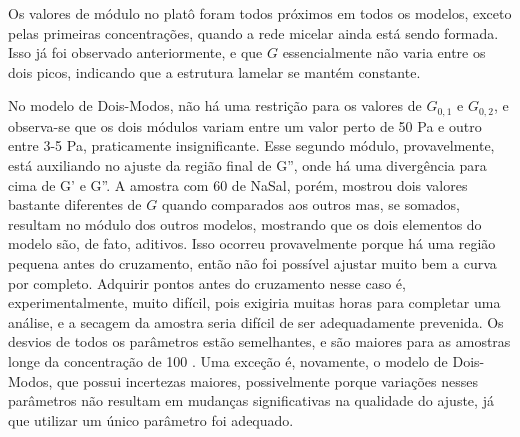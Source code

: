 	Os valores de módulo no platô foram todos próximos em todos os modelos, exceto pelas primeiras concentrações, quando a rede micelar ainda está sendo formada. Isso já foi observado anteriormente\cite{Rehage1991}, e que \(G\) essencialmente não varia entre os dois picos, indicando que a estrutura lamelar se mantém constante.
	
	No modelo de Dois-Modos, não há uma restrição para os valores de \(G_{0,1}\) e \(G_{0,2}\), e observa-se que os dois módulos variam entre um valor perto de 50 Pa e outro entre 3-5 Pa, praticamente insignificante. Esse segundo módulo, provavelmente, está auxiliando no ajuste da região final de G'', onde há uma divergência para cima de G' e G''. A amostra com 60 \mM{} de NaSal, porém, mostrou dois valores bastante diferentes de \(G\) quando comparados aos outros mas, se somados, resultam no módulo dos outros modelos, mostrando que os dois elementos do modelo são, de fato, aditivos. Isso ocorreu provavelmente porque há uma região pequena antes do cruzamento, então não foi possível ajustar muito bem a curva por completo. Adquirir pontos antes do cruzamento nesse caso é, experimentalmente, muito difícil, pois exigiria muitas horas para completar uma análise, e a secagem da amostra seria difícil de ser adequadamente prevenida. Os desvios de todos os parâmetros estão semelhantes, e são maiores para as amostras longe da concentração de 100 \mM. Uma exceção é, novamente, o modelo de Dois-Modos, que possui incertezas maiores, possivelmente porque variações nesses parâmetros não resultam em mudanças significativas na qualidade do ajuste, já que utilizar um único parâmetro foi adequado.
	
